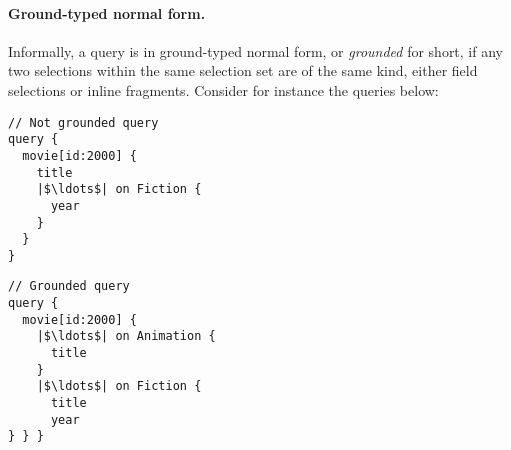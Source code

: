 

\paragraph{Ground-typed normal form.}
Informally, a query is in ground-typed normal form, or {\em grounded}
for short, if %
any two selections within the same selection set are of the same kind,
either field selections or inline fragments. 
Consider for instance the queries below:

\smallskip

\begin{minipage}[t]{.25\textwidth}
\begin{verbatim}
// Not grounded query
query {
  movie[id:2000] {
    title
    |$\ldots$| on Fiction {
	  year
    }
  }
}
\end{verbatim}
\end{minipage}%
\begin{minipage}[t]{.25\textwidth}
\begin{verbatim}
// Grounded query
query {
  movie[id:2000] {
    |$\ldots$| on Animation {
      title
    }
    |$\ldots$| on Fiction {
      title
      year
} } }
\end{verbatim} 
\end{minipage}

\medskip

